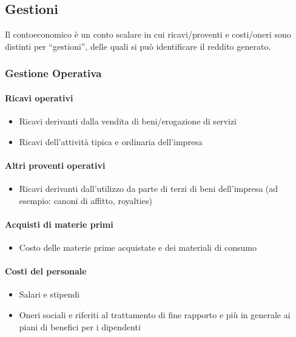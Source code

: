 \subsection{Gestioni}
Il \gls{contoeconomico} è un conto scalare in cui ricavi/proventi e costi/oneri sono distinti per ``gestioni'',
delle quali si può identificare il reddito generato.

\subsubsection{Gestione Operativa}

\paragraph{Ricavi operativi}
\begin{itemize}
    \item Ricavi derivanti dalla vendita di beni/erogazione di servizi
    \item Ricavi dell’attività tipica e ordinaria dell’impresa
\end{itemize}

\paragraph{Altri proventi operativi}
\begin{itemize}
    \item Ricavi derivanti dall’utilizzo da parte di terzi di beni dell’impresa (ad
    esempio: canoni di affitto, royalties)
\end{itemize}

\paragraph{Acquisti di materie primi}
\begin{itemize}
    \item Costo delle materie prime acquistate e dei materiali
    di consumo
\end{itemize}

\paragraph{Costi del personale}
\begin{itemize}
    \item Salari e stipendi
    \item Oneri sociali e riferiti al trattamento di
    fine rapporto e più in generale ai piani di benefici per i dipendenti
\end{itemize}

